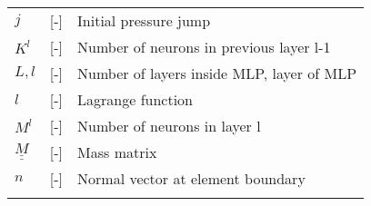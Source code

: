 \begin{tabular}{lll}
  \vspace{1mm}
   $j$              & [-]             & Initial pressure jump \\
   \vspace{1mm}
   $K^l$              & [-]             & Number of neurons in previous layer l-1\\         
   \vspace{1mm}
   $L,l$              & [-]             & Number of layers inside MLP, layer of MLP\\    
   \vspace{1mm}
   $l$              & [-]            & Lagrange function \\
   \vspace{1mm}
   $M^l$              & [-]             & Number of neurons in layer l\\         
   \vspace{1mm}
   $\underline{\underline{M}}$              & [-]             & Mass matrix\\
      \vspace{1mm}
          $n$              & [-]             & 
Normal vector at element boundary\\   
\vspace{1mm}
\end{tabular}

